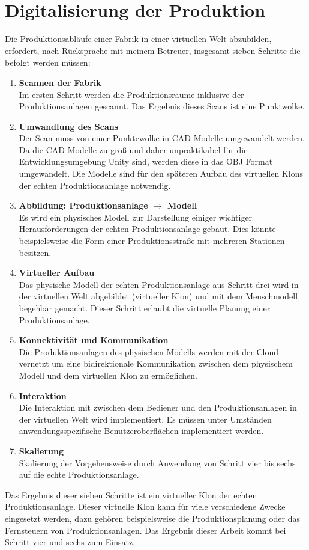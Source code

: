 \section{Digitalisierung der Produktion}\label{sec:PhysischZumKlon}
Die Produktionsabläufe einer Fabrik in einer virtuellen Welt abzubilden, erfordert, nach Rücksprache mit meinem Betreuer, insgesamt sieben Schritte die befolgt werden müssen:
\begin{enumerate}
	\item \textbf{Scannen der Fabrik} \\
	Im ersten Schritt werden die Produktionsräume inklusive der Produktionsanlagen gescannt. Das Ergebnis dieses Scans ist eine Punktwolke.
	\item \textbf{Umwandlung des Scans} \\
	Der Scan muss von einer Punktewolke in CAD Modelle umgewandelt werden. Da die CAD Modelle zu groß und daher unpraktikabel für die Entwicklungsumgebung Unity sind, werden diese in das OBJ Format umgewandelt. Die Modelle sind für den späteren Aufbau des virtuellen Klons der echten Produktionsanlage notwendig.
	\item \textbf{Abbildung: Produktionsanlage $\rightarrow$ Modell} \\
	Es wird ein physisches Modell zur Darstellung einiger wichtiger Herausforderungen der echten Produktionsanlage gebaut. Dies könnte beispielsweise die Form einer Produktionsstraße mit mehreren Stationen besitzen.
	\item \textbf{Virtueller Aufbau} \\
	Das physische Modell der echten Produktionsanlage aus Schritt drei wird in der virtuellen Welt abgebildet (virtueller Klon) und mit dem Menschmodell begehbar gemacht. Dieser Schritt erlaubt die virtuelle Planung einer Produktionsanlage.
	\item \textbf{Konnektivität und Kommunikation} \\
	Die Produktionsanlagen des physischen Modells werden mit der Cloud vernetzt um eine bidirektionale Kommunikation zwischen dem physischem Modell und dem virtuellen Klon zu ermöglichen.
	\item \textbf{Interaktion} \\
	Die Interaktion mit zwischen dem Bediener und den Produktionsanlagen in der virtuellen Welt wird implementiert. Es müssen unter Umständen anwendungsspezifische Benutzeroberflächen implementiert werden.
	\item \textbf{Skalierung} \\
	Skalierung der Vorgehensweise durch Anwendung von Schritt vier bis sechs auf die echte Produktionsanlage.
\end{enumerate}
Das Ergebnis dieser sieben Schritte ist ein virtueller Klon der echten Produktionsanlage. Dieser virtuelle Klon kann für viele verschiedene Zwecke eingesetzt werden, dazu gehören beispielsweise die Produktionsplanung oder das Fernsteuern von Produktionsanlagen. Das Ergebnis dieser Arbeit kommt bei Schritt vier und sechs zum Einsatz.

